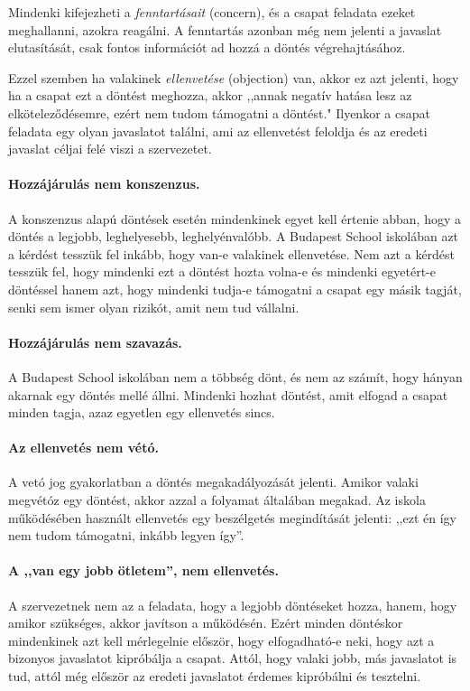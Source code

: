 Mindenki kifejezheti a \emph{fenntartásait} (concern), és a csapat feladata ezeket meghallanni, azokra reagálni. A fenntartás azonban még nem jelenti a javaslat elutasítását, csak fontos információt ad hozzá a döntés végrehajtásához.

Ezzel szemben ha valakinek \emph{ellenvetése} (objection) van, akkor ez azt jelenti, hogy ha a csapat ezt a döntést meghozza, akkor ,,annak negatív hatása lesz az elköteleződésemre, ezért nem tudom támogatni a döntést." Ilyenkor a csapat feladata egy olyan javaslatot találni, ami az ellenvetést feloldja és az eredeti javaslat céljai felé viszi a szervezetet.

\paragraph{Hozzájárulás nem konszenzus.} A konszenzus alapú döntések esetén mindenkinek egyet kell értenie abban, hogy a döntés a legjobb, leghelyesebb, leghelyénvalóbb. A Budapest School iskolában azt a kérdést tesszük fel inkább, hogy van-e valakinek ellenvetése. Nem azt a kérdést tesszük fel, hogy mindenki ezt a döntést hozta volna-e és mindenki egyetért-e döntéssel hanem azt, hogy mindenki tudja-e támogatni a csapat egy másik tagját, senki sem ismer olyan rizikót, amit nem tud vállalni.

\paragraph{Hozzájárulás nem szavazás.} A Budapest School iskolában nem a többség dönt, és nem az számít, hogy hányan akarnak egy döntés mellé állni. Mindenki hozhat döntést, amit elfogad a csapat minden tagja, azaz egyetlen egy ellenvetés sincs.

\paragraph{Az ellenvetés nem vétó.} A vetó jog gyakorlatban a döntés megakadályozását jelenti. Amikor valaki megvétóz egy döntést, akkor azzal a folyamat általában megakad. Az iskola működésében használt ellenvetés egy beszélgetés megindítását jelenti: ,,ezt én így nem tudom támogatni, inkább legyen így''.

\paragraph{A ,,van egy jobb ötletem'', nem ellenvetés.} A szervezetnek nem az a feladata, hogy a legjobb döntéseket hozza, hanem, hogy amikor szükséges, akkor javítson a működésén. Ezért minden döntéskor mindenkinek azt kell mérlegelnie először, hogy elfogadható-e neki, hogy azt a bizonyos javaslatot kipróbálja a csapat. Attól, hogy valaki jobb, más javaslatot is tud, attól még először az eredeti javaslatot érdemes kipróbálni és tesztelni.


